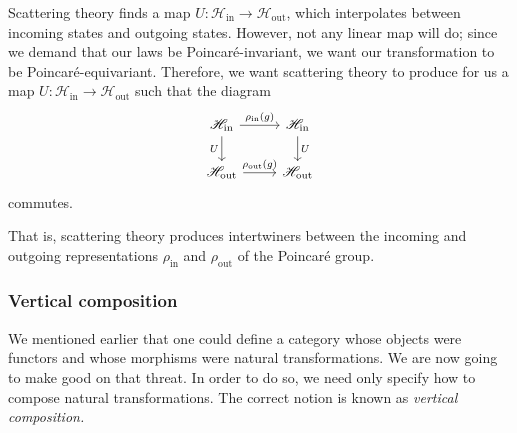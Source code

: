 \documentclass[main.tex]{subfiles}
\begin{document}
\begin{example}
  Scattering theory finds a map $U\colon \mathscr{H}_{\mathrm{in}} \to \mathscr{H}_{\mathrm{out}}$, which interpolates between incoming states and outgoing states. However, not any linear map will do; since we demand that our laws be Poincaré-invariant, we want our transformation to be Poincaré-equivariant. Therefore, we want scattering theory to produce for us a map $U\colon \mathscr{H}_{\mathrm{in}} \to \mathscr{H}_{\mathrm{out}}$ such that the diagram
  \begin{equation*}
    \begin{tikzcd}
      \mathscr{H}_{\mathrm{in}}
      \arrow[r, "\rho_{\mathrm{in}}(g)"]
      \arrow[d, swap, "U"]
      & \mathscr{H}_{\mathrm{in}}
      \arrow[d, "U"]
      \\
      \mathscr{H}_{\mathrm{out}}
      \arrow[r, "\rho_{\mathrm{out}}(g)"]
      & \mathscr{H}_{\mathrm{out}}
    \end{tikzcd}
  \end{equation*}
  commutes.

  That is, scattering theory produces intertwiners between the incoming and outgoing representations $\rho_{\mathrm{in}}$ and $\rho_{\mathrm{out}}$ of the Poincaré group.
\end{example}


\subsubsection{Vertical composition}

We mentioned earlier that one could define a category whose objects were functors and whose morphisms were natural transformations. We are now going to make good on that threat. In order to do so, we need only specify how to compose natural transformations. The correct notion is known as \emph{vertical composition.}
\end{document}
